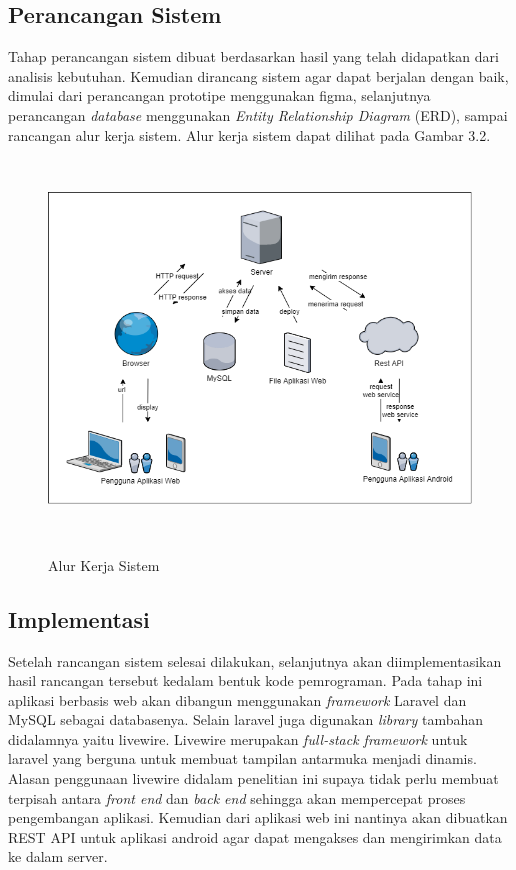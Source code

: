 
\subsection{Perancangan Sistem}
Tahap perancangan sistem dibuat berdasarkan hasil yang telah didapatkan dari analisis kebutuhan. Kemudian dirancang sistem agar dapat berjalan dengan baik, dimulai dari perancangan prototipe menggunakan figma, selanjutnya perancangan \textit{database} menggunakan \textit{Entity Relationship Diagram} (ERD), sampai rancangan alur kerja sistem. Alur kerja sistem dapat dilihat pada Gambar 3.2.

\begin{figure}[H]
\centering
{\includegraphics [width = 14cm, height= 10cm]{gambar/alur_kerja_sistem}}
\caption{Alur Kerja Sistem}
\label{alur_kerja_sistem}
\end{figure}

\subsection{Implementasi}
Setelah rancangan sistem selesai dilakukan, selanjutnya akan diimplementasikan hasil rancangan tersebut kedalam bentuk kode pemrograman. Pada tahap ini aplikasi berbasis web akan dibangun menggunakan \textit{framework} Laravel dan MySQL sebagai databasenya. Selain laravel juga digunakan \textit{library} tambahan didalamnya yaitu livewire. Livewire merupakan \textit{full-stack framework} untuk laravel yang berguna untuk membuat tampilan antarmuka menjadi dinamis. Alasan penggunaan livewire didalam penelitian ini supaya tidak perlu membuat terpisah antara \textit{front end} dan \textit{back end} sehingga akan mempercepat proses pengembangan aplikasi. Kemudian dari aplikasi web ini nantinya akan dibuatkan REST API untuk aplikasi android agar dapat mengakses dan mengirimkan data ke dalam server.

